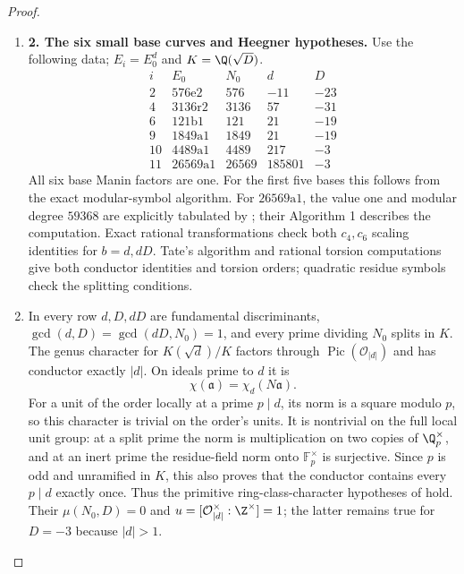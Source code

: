 \begin{proof}
\begin{enumerate}[label=\arabic*.,leftmargin=*]
\item \textbf{2. The six small base curves and Heegner hypotheses.}
Use the following data; $E_i=E_0^d$ and $K=\Q(\sqrt D)$.
\[
\begin{array}{c|c|r|r|r}
 i&E_0&N_0&d&D\\\hline
 2&576\mathrm e2&576&-11&-23\\
 4&3136\mathrm r2&3136&57&-31\\
 6&121\mathrm b1&121&21&-19\\
 9&1849\mathrm a1&1849&21&-19\\
 10&4489\mathrm a1&4489&217&-3\\
 11&26569\mathrm a1&26569&185801&-3
\end{array}
\]
All six base Manin factors are one. For the first five bases this follows from the exact
modular-symbol algorithm. For $26569\mathrm a1$, the value one and modular degree
$59368$ are explicitly tabulated by
\citet[Appendix B, p.~102, unnumbered $26569\mathrm a1/26569\mathrm a2$
block]{CgzBelabas2019}; their Algorithm 1 describes the computation.
Exact rational transformations check both $c_4,c_6$ scaling
identities for $b=d,dD$. Tate's algorithm and rational torsion
computations give both conductor identities and torsion orders;
quadratic residue symbols check the splitting conditions.

\item In every row $d,D,dD$ are fundamental discriminants,
$\gcd(d,D)=\gcd(dD,N_0)=1$, and every prime dividing $N_0$ splits
in $K$. The genus character for $K(\sqrt d)/K$ factors through
$\operatorname{Pic}(\mathcal O_{|d|})$ and has conductor exactly
$|d|$. On ideals prime to $d$ it is
\[
 \chi(\mathfrak a)=\chi_d(N\mathfrak a).
\]
For a unit of the order locally at a prime $p\mid d$, its norm is
a square modulo $p$, so this character is trivial on the order's
units. It is nontrivial on the full local unit group: at a split
prime the norm is multiplication on two copies of $\Q_p^\times$,
and at an inert prime the residue-field norm onto $\mathbb F_p^\times$
is surjective. Since $p$ is odd and unramified in $K$, this also
proves that the conductor contains every $p\mid d$ exactly once.
Thus the primitive ring-class-character hypotheses of
\citet[Theorem 1.1, pp.~2524--2525]{CgzCai2014} hold. Their
$\mu(N_0,D)=0$ and
$u=[\mathcal O_{|d|}^{\times}:\Z^{\times}]=1$; the latter remains
true for $D=-3$ because $|d|>1$.


\end{enumerate}
\end{proof}
